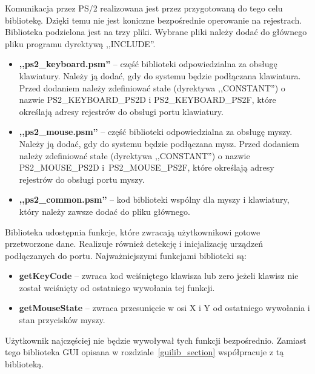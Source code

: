 Komunikacja przez PS/2 realizowana jest przez przygotowaną do tego celu bibliotekę. Dzięki temu nie jest koniczne bezpośrednie operowanie na rejestrach. Biblioteka podzielona jest na trzy pliki. Wybrane pliki należy dodać do głównego pliku programu dyrektywą ,,INCLUDE''.

\begin{itemize}
	\item  \textbf{,,ps2\_keyboard.psm''} -- część biblioteki odpowiedzialna za obsługę klawiatury. Należy ją dodać, gdy do systemu będzie podłączana klawiatura. Przed dodaniem należy zdefiniować stałe (dyrektywa ,,CONSTANT'') o nazwie PS2\_KEYBOARD\_PS2D i PS2\_KEYBOARD\_PS2F, które określają adresy rejestrów do obsługi portu klawiatury.
	
	\item  \textbf{,,ps2\_mouse.psm''} -- część biblioteki odpowiedzialna za obsługę myszy. Należy ją dodać, gdy do systemu będzie podłączana mysz. Przed dodaniem należy zdefiniować stałe (dyrektywa ,,CONSTANT'') o nazwie PS2\_MOUSE\_PS2D i~PS2\_MOUSE\_PS2F, które określają adresy rejestrów do obsługi portu myszy.
	
	\item  \textbf{,,ps2\_common.psm''} -- kod biblioteki wspólny dla myszy i klawiatury, który należy zawsze dodać do pliku głównego.
\end{itemize}


Biblioteka udostępnia funkcje, które zwracają użytkownikowi gotowe przetworzone dane. Realizuje również detekcję i inicjalizację urządzeń podłączanych do portu. Najważniejszymi funkcjami biblioteki są:

\begin{itemize}
	\item  \textbf{getKeyCode} -- zwraca kod wciśniętego klawisza lub zero jeżeli klawisz nie został wciśnięty od ostatniego wywołania tej funkcji.
	\item  \textbf{getMouseState} -- zwraca przesunięcie w osi X i Y od ostatniego wywołania i stan przycisków myszy.
\end{itemize}

Użytkownik najczęściej nie będzie wywoływał tych funkcji bezpośrednio. Zamiast tego biblioteka GUI opisana w rozdziale~\ref{guilib_section} współpracuje z tą biblioteką.

